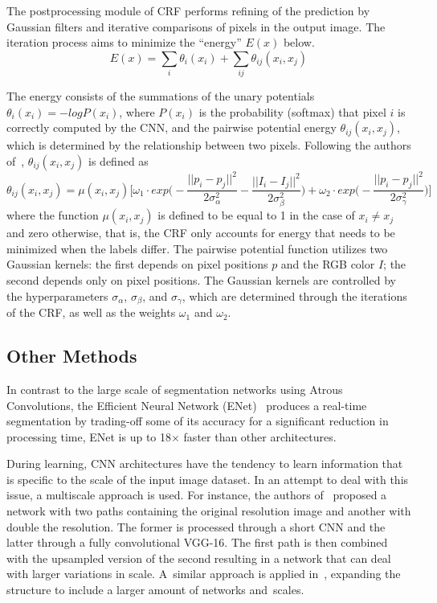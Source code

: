 \documentclass[sensors,article,accept,moreauthors,pdftex]{Definitions/mdpi}
\begin{document}
The postprocessing module of CRF performs refining of the prediction by Gaussian filters and iterative comparisons of pixels in the output image. The iteration process aims to minimize the ``energy'' $E(x)$ below.
\begin{equation}
E(x)=\sum_{i}\theta_{i}(x_i)+\sum_{ij}\theta_{ij}(x_i,x_{j})
\end{equation}

The energy consists of the summations of the unary potentials $\theta_i(x_i) = -logP(x_i)$, where $P(x_i)$ is the probability (softmax) that pixel $i$ is correctly computed by the CNN, and the pairwise potential energy $\theta_{ij}(x_i,x_{j})$, which is determined by the relationship between two pixels.
Following the authors of~\cite{CRF}, $\theta_{ij}(x_i,x_j)$ is defined as
\begin{equation}
\theta_{ij}(x_i,x_{j})=\mu(x_i,x_j)\Big[\omega_1\cdot exp\Big(-\frac{||p_i-p_j||^2}{2\sigma_{\alpha}^{2}}-\frac{||I_i-I_j||^2}{2\sigma_{\beta}^{2}}\Big) +\omega_2\cdot exp\Big(-\frac{||p_i-p_j||^2}{2\sigma_{\gamma}^{2}}\Big)\Big]
\end{equation}
where the function $\mu(x_i,x_j)$ is defined to be equal to 1 in the case of $x_i \neq x_j$ and zero otherwise, that is, the CRF only accounts for energy that needs to be minimized when the labels differ. The pairwise potential function utilizes two Gaussian kernels: the first depends on pixel positions $p$ and the RGB color $I$; the second depends only on pixel positions. The Gaussian kernels are controlled by the hyperparameters $\sigma_{\alpha}$, $\sigma_{\beta}$, and  $\sigma_{\gamma}$, which are determined through the iterations of the CRF, as well as the weights $\omega_1$ and $\omega_2$.


\subsection{Other Methods}
In contrast to the large scale of segmentation networks using Atrous Convolutions, the Efficient Neural Network (ENet)~\cite{Enet} produces a real-time segmentation by trading-off some of its accuracy for a significant reduction in processing time, ENet is up to 18$\times$ faster than other architectures.

During learning, CNN architectures have the tendency to learn information that is specific to the scale of the input image dataset. In an attempt to deal with this issue, a multiscale approach is used. For instance, the authors of~\cite{Multi-scale-Raj} proposed a network with two paths containing the original resolution image and another with double the resolution. The former is processed through a short CNN and the latter through a fully convolutional VGG-16. The first path is then combined with the upsampled version of the second resulting in a network that can deal with larger variations in scale. \mbox{A similar} approach is applied in~\cite{Multi-scale-Eigen,Multi-scale-Roy,Multi-scale-Bian}, expanding the structure to include a larger amount of networks and~scales.
\end{document}
